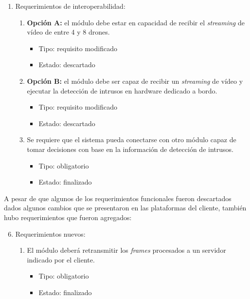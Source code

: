 \begin{enumerate}
\begin{enumerate}
\begin{itemize}
	\end{itemize}
\end{enumerate}
\item Requerimientos de interoperabilidad:
\begin{enumerate}
	\item \textbf{Opción A:} el módulo debe estar en capacidad de recibir el \textit{streaming} de vídeo de entre 4 y 8 drones.
	\begin{itemize}
		\item Tipo: requisito modificado
		\item Estado: descartado
	\end{itemize}
	\item \textbf{Opción B:} el módulo debe ser capaz de recibir un \textit{streaming} de vídeo y ejecutar la detección de intrusos en hardware dedicado a bordo.
	\begin{itemize}
		\item Tipo: requisito modificado
		\item Estado: descartado
	\end{itemize}
	\item Se requiere que el sistema pueda conectarse con otro módulo capaz de tomar decisiones con base en la información de detección de intrusos.
	\begin{itemize}
		\item Tipo: obligatorio
		\item Estado: finalizado
	\end{itemize}
\end{enumerate}
\end{enumerate}


A pesar de que algunos de los requerimientos funcionales fueron descartados dados algunos cambios que se presentaron en las plataformas del cliente, también hubo requerimientos que fueron agregados:

\begin{enumerate}
\setcounter{enumi}{5}
\item Requerimientos nuevos:
\begin{enumerate}
	\item El módulo deberá retransmitir los \textit{frames} procesados a un servidor indicado por el cliente. 
	\begin{itemize}
		\item Tipo: obligatorio
		\item Estado: finalizado
	\end{itemize}
\end{enumerate}
\end{enumerate}

